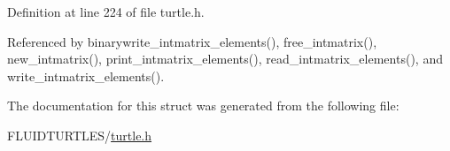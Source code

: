 Definition at line 224 of file turtle.\-h.



Referenced by binarywrite\-\_\-intmatrix\-\_\-elements(), free\-\_\-intmatrix(), new\-\_\-intmatrix(), print\-\_\-intmatrix\-\_\-elements(), read\-\_\-intmatrix\-\_\-elements(), and write\-\_\-intmatrix\-\_\-elements().



The documentation for this struct was generated from the following file\-:\begin{DoxyCompactItemize}
\item 
F\-L\-U\-I\-D\-T\-U\-R\-T\-L\-E\-S/\hyperlink{turtle_8h}{turtle.\-h}\end{DoxyCompactItemize}
